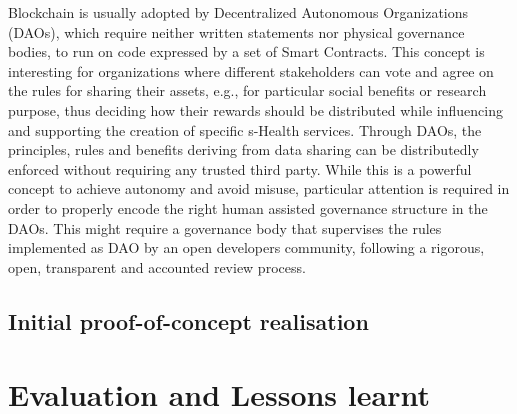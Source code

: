 \documentclass[conference]{IEEEtran}
\begin{document}
Blockchain is usually adopted by Decentralized Autonomous Organizations (DAOs), which require neither written statements nor physical governance bodies, to run on code expressed by a set of Smart Contracts. This concept is interesting for organizations where different stakeholders can vote and agree on the rules for sharing their assets, e.g., for particular social benefits or research purpose, thus deciding how their rewards should be distributed while influencing and supporting the creation of specific s-Health services. Through DAOs, the principles, rules and benefits deriving from data sharing can be distributedly enforced without requiring any trusted third party. While this is a powerful concept to achieve autonomy and avoid misuse, particular attention is required in order to properly encode the right human assisted governance structure in the DAOs. This might require a governance body that supervises the rules implemented as DAO by an open developers community, following a rigorous, open, transparent and accounted review process.



\subsection{Initial proof-of-concept realisation}




\section{Evaluation and Lessons learnt}

\end{document}
